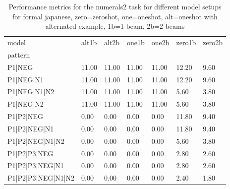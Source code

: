 \begin{table}[h]
\begin{tabular}{l|llllll}
\toprule
model & alt1b & alt2b & one1b & one2b & zero1b & zero2b \\
pattern &  &  &  &  &  &  \\
\midrule
P1|NEG & 11.00 & 11.00 & 11.00 & 11.00 & 12.20 & 9.60 \\
P1|NEG|N1 & 11.00 & 11.00 & 11.00 & 11.00 & 12.20 & 9.60 \\
P1|NEG|N1|N2 & 11.00 & 11.00 & 11.00 & 11.00 & 5.60 & 3.80 \\
P1|NEG|N2 & 11.00 & 11.00 & 11.00 & 11.00 & 5.60 & 3.80 \\
P1|P2|NEG & 0.00 & 0.00 & 0.00 & 0.00 & 11.80 & 9.40 \\
P1|P2|NEG|N1 & 0.00 & 0.00 & 0.00 & 0.00 & 11.80 & 9.40 \\
P1|P2|NEG|N1|N2 & 0.00 & 0.00 & 0.00 & 0.00 & 5.60 & 3.80 \\
P1|P2|P3|NEG & 0.00 & 0.00 & 0.00 & 0.00 & 2.80 & 2.60 \\
P1|P2|P3|NEG|N1 & 0.00 & 0.00 & 0.00 & 0.00 & 2.80 & 2.60 \\
P1|P2|P3|NEG|N1|N2 & 0.00 & 0.00 & 0.00 & 0.00 & 2.40 & 1.80 \\
\bottomrule
\end{tabular}
\caption{Performance metrics for the numerals2 task for different model setups for formal japanese, zero=zeroshot, one=oneshot, alt=oneshot with alternated example, 1b=1 beam, 2b=2 beams}
\label{tab:ja form_numerals2_performance}
\end{table}

